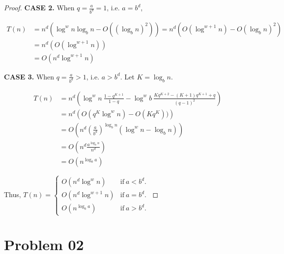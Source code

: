 \documentclass{article}
\begin{document}
\begin{proof}
    \vspace{-1em} \hspace{1.3em}
    \textbf{CASE 2.} When $q=\frac{a}{b^d}=1$, i.e. $a=b^d$,
    
    \vspace{-2.5em}
    \begin{align*}
        T(n) &= n^d\left(\log^{w}n\log_{b}n-O\left(\left(\log_{b}n\right)^2\right)\right) 
        = n^d\left(O\left(\log^{w+1}n\right)-O\left(\log_{b}n\right)^2\right) \\
        &= n^d\left(O\left(\log^{w+1}n\right)\right) \\
        &= O\left(n^d\log^{w+1}n\right)
    \end{align*}
    
     \vspace{-1em} \hspace{1.3em}
    \textbf{CASE 3.} When $q=\frac{a}{b^d}>1$, i.e. $a>b^d$. Let $K=\log_{b}n$.
    
    \vspace{-2.5em}
    \begin{align*}
        T(n) &= n^d\left( \log^{w}n\ \frac{1-q^{K+1}}{1-q} - \log^{w}b \ \frac{K q^{K+2}-(K+1)q^{K+1}+q}{(q-1)^2}\right) \\
        &= n^d \left(O\left(q^{K}\log^{w}n\right)-O(Kq^K))\right) \\
        &= O\left(n^d\left(\frac{a}{b^d}\right)^{\log_{b}n}\left(\log^{w}n-\log_b{n}\right)\right) \\
        &= O\left(n^d\frac{a^{\log_{b}n}}{n^d}\right) \\
        &= O\left(n^{\log_{b}a}\right)
    \end{align*}
    
    Thus, 
    $T(n)=\left\{
    \begin{array}{ll}
        O\left(n^d\log^{w}n\right) & \mathrm{if\ }a<b^d. \\
        O\left(n^d\log^{w+1}n\right) & \mathrm{if\ }a=b^d. \\
        O\left(n^{\log_{b}a}\right) & \mathrm{if\ }a>b^d.
    \end{array}
    \right.$
\end{proof}

\newpage

\vspace{3em}
\section{Problem 02}
\end{document}
